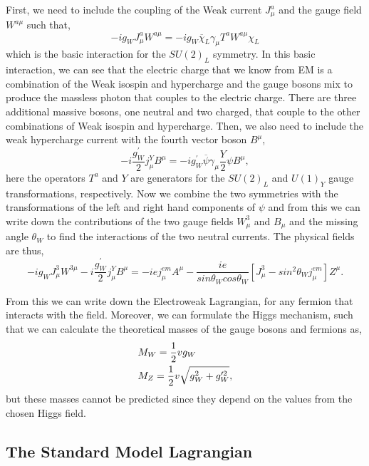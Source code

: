 First, we need to include the coupling of the Weak current $J^a_\mu$ and the gauge field $W^{a\mu}$ such that,
\begin{equation}
-ig_WJ^a_\mu W^{a\mu}=-ig_W\overline{\chi}_L\gamma_\mu T^aW^{a\mu}\chi_L
\end{equation}
which is the basic interaction for the $SU(2)_L$ symmetry. In this basic interaction, we can see that the electric charge that we know from EM is a combination of the Weak isospin and hypercharge and the gauge bosons mix to produce the massless photon that couples to the electric charge. There are three additional massive bosons, one neutral and two charged, that couple to the other combinations of Weak isospin and hypercharge. Then, we also need to include the weak hypercharge current with the fourth vector boson $B^\mu$,
\begin{equation}
-i\frac{g_W^{\prime}}{2}j_\mu^YB^\mu=-ig_W^{\prime}\overline{\psi}\gamma_\mu\frac{Y}{2}\psi B^\mu, 
\end{equation}
here the operators $T^a$ and $Y$ are generators for the $SU(2)_L$ and $U(1)_Y$ gauge transformations, respectively. Now we combine the two symmetries with the transformations of the left and right hand components of $\psi$ and from this we can write down the contributions of the two gauge fields $W_\mu^3$ and $B_\mu$ and the missing angle $\theta_W$ to find the interactions of the two neutral currents. The physical fields are thus,
\begin{equation}
-ig_WJ_\mu^3W^{3\mu}-i\frac{g_W^{\prime}}{2}j_\mu^YB^\mu=-iej_\mu^{em}A^\mu-\frac{ie}{sin\theta_Wcos\theta_W}[J_\mu^3-sin^2\theta_Wj_\mu^{em}]Z^\mu.
\end{equation}

From this we can write down the Electroweak Lagrangian, for any fermion that interacts with the field. Moreover, we can formulate the Higgs mechanism, such that we can calculate the theoretical masses of the gauge bosons and fermions as, 
\begin{equation}
\begin{split}
& M_{W}=\frac{1}{2}vg_W \\
& M_{Z}=\frac{1}{2}v\sqrt{g_W^2+g_W^{\prime 2}},
\end{split}
\end{equation}
but these masses cannot be predicted since they depend on the values from the chosen Higgs field. 

\subsection{The Standard Model Lagrangian}

